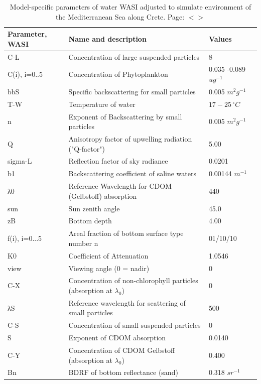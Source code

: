 \documentclass[11pt]{article}
\begin{document}
\begin{table}[H]\footnotesize
	\caption{Model-specific parameters of water WASI adjusted to simulate environment of the Mediterranean Sea along Crete. Page: $<$\pageref{page-36}$>$}
	\centering
	 \begin{tabular}{|  p{2cm} | p{6cm} | p{25mm} | }
	    \hline
		    \textbf{Parameter, WASI} & \textbf{Name and description} & \textbf{Values} \\ \hline\hline
		    C-L & Concentration of large suspended particles & 8 \\ \hline
		   C(i), i=0..5 & Concentration of Phytoplankton & 0.035 -0.089 $ug^{-1}$ \\ \hline
		    bbS & Specific backscattering for small particles & 0.005 $m^2g^{-1}$ \\ \hline
		   T-W & Temperature of water & $17-25\,^{\circ}C$ \\ \hline
		    n & Exponent of Backscattering by small particles & 0.005 $m^2g^{-1}$ \\ \hline
		    Q &Anisotropy factor of upwelling radiation ("Q-factor") & 5.00 \\ \hline
		    sigma-L & Reflection factor of sky radiance & 0.0201 \\ \hline
		    b1 & Backscattering coefficient of saline waters & 0.00144 $m^{-1}$ \\ \hline
		    λ0 & Reference Wavelength for \ac{CDOM} (Gelbstoff) absorption & 440 \\ \hline
		    sun & Sun zenith angle & 45.0 \\ \hline
		    zB & Bottom depth & 4.00 \\ \hline
		   f(i), i=0...5 & Areal fraction of bottom surface type number n & 01/10/10 \\ \hline
		    K0 & Coefficient of Attenuation & 1.0546 \\ \hline
		   view & Viewing angle (0 = nadir) & 0\\ \hline
		    C-X & Concentration of non-chlorophyll particles (absorption at $\lambda_0$) & 0 \\ \hline
		   λS & Reference wavelength for scattering of small particles & 500 \\ \hline
		    C-S & Concentration of small suspended particles & 0 \\ \hline
		   S & Exponent of \ac{CDOM} absorption & 0.0140 \\ \hline
		    C-Y & Concentration of \ac{CDOM} Gelbstoff (absorption at $\lambda_0$) & 0.400 \\ \hline
		    Bn & BDRF of bottom reflectance (sand) & 0.318 $sr^{-1}$\\
	    \hline
	  \end{tabular}
	   \label{tab:3}
\end{table}
\end{document}
